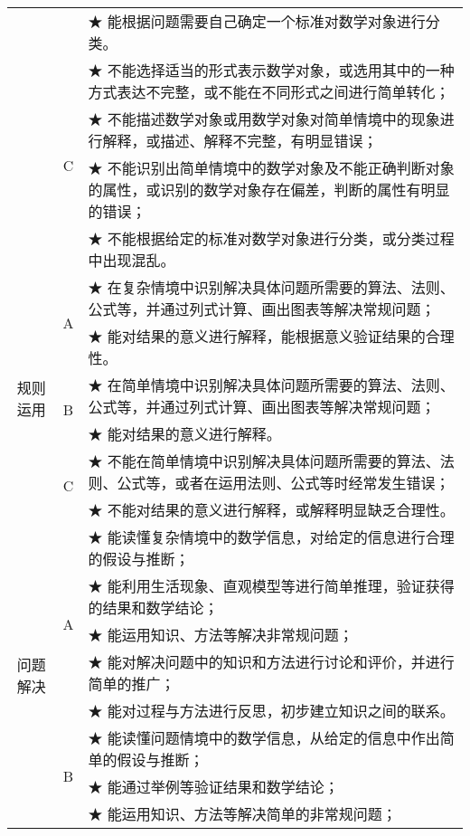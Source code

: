 \begin{itshape}
\begin{longtable}{|c|c|p{12cm}|}
   & &  ★ 能根据问题需要自己确定一个标准对数学对象进行分类。 \\    
\cline{2-3}      

   &   \multirow{4}{*}{C}  &  ★ 不能选择适当的形式表示数学对象，或选用其中的一种方式表达不完整，或不能在不同形式之间进行简单转化；\\  
   & &  ★ 不能描述数学对象或用数学对象对简单情境中的现象进行解释，或描述、解释不完整，有明显错误；\\  
   & &  ★ 不能识别出简单情境中的数学对象及不能正确判断对象的属性，或识别的数学对象存在偏差，判断的属性有明显的错误； \\   
   & &  ★ 不能根据给定的标准对数学对象进行分类，或分类过程中出现混乱。 \\   
\hline
   
   \multirow{6}{*}{规则运用}  & \multirow{2}{*}{A}  & ★   在复杂情境中识别解决具体问题所需要的算法、法则、公式等，并通过列式计算、画出图表等解决常规问题； \\    
   & &  ★ 能对结果的意义进行解释，能根据意义验证结果的合理性。 \\   
\cline{2-3}      

   &   \multirow{2}{*}{B}  &  ★ 在简单情境中识别解决具体问题所需要的算法、法则、公式等，并通过列式计算、画出图表等解决常规问题；\\  
   & &  ★   能对结果的意义进行解释。\\   
\cline{2-3}      

   &   \multirow{2}{*}{C}  &  ★ 不能在简单情境中识别解决具体问题所需要的算法、法则、公式等，或者在运用法则、公式等时经常发生错误；\\  
   & &  ★ 不能对结果的意义进行解释，或解释明显缺乏合理性。\\  
\hline
   
   \multirow{13}{*}{问题解决}  & \multirow{5}{*}{A}  & ★ 能读懂复杂情境中的数学信息，对给定的信息进行合理的假设与推断； \\    
   & &  ★ 能利用生活现象、直观模型等进行简单推理，验证获得的结果和数学结论； \\  
   & &  ★ 能运用知识、方法等解决非常规问题；\\    
   & &  ★ 能对解决问题中的知识和方法进行讨论和评价，并进行简单的推广；\\  
   & &  ★ 能对过程与方法进行反思，初步建立知识之间的联系。\\    
\cline{2-3}      

    &   \multirow{4}{*}{B}  &  ★ 能读懂问题情境中的数学信息，从给定的信息中作出简单的假设与推断；\\  
   & &  ★   能通过举例等验证结果和数学结论；\\  
   & &  ★ 能运用知识、方法等解决简单的非常规问题； \\   
   

\end{longtable}
\end{itshape}
